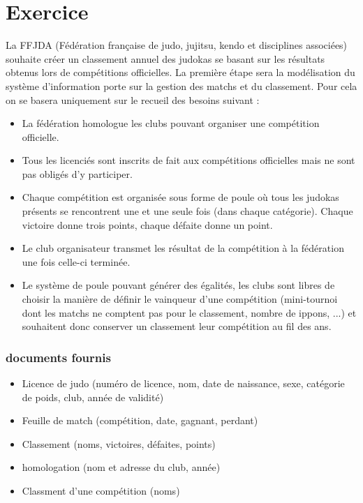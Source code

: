 \section*{Exercice}

La FFJDA (Fédération française de judo, jujitsu, kendo et disciplines associées) souhaite créer un classement annuel des judokas se basant sur les résultats obtenus lors de compétitions officielles. La première étape sera la modélisation du système d'information porte sur la gestion des matchs et du classement. Pour cela on se basera uniquement sur le recueil des besoins suivant : \\
\begin{itemize}
	\item La fédération homologue les clubs pouvant organiser une compétition officielle.
	\item Tous les licenciés sont inscrits de fait aux compétitions officielles mais ne sont pas obligés d'y participer.
	\item Chaque compétition est organisée sous forme de poule où tous les judokas présents se rencontrent une et une seule fois (dans chaque catégorie). Chaque victoire donne trois points, chaque défaite donne un point. 
	\item Le club organisateur transmet les résultat de la compétition à la fédération une fois celle-ci terminée.
	\item Le système de poule pouvant générer des égalités, les clubs sont libres de choisir la manière de définir le vainqueur d'une compétition (mini-tournoi dont les matchs ne comptent pas pour le classement, nombre de ippons, ...) et souhaitent donc conserver un classement leur compétition au fil des ans.
\end{itemize}

\subsubsection*{documents fournis}

\begin{itemize}
	\item Licence de judo (numéro de licence, nom, date de naissance, sexe, catégorie de poids, club, année de validité)
	\item Feuille de match (compétition, date, gagnant, perdant)
	\item Classement (noms, victoires, défaites, points)
	\item homologation (nom et adresse du club, année)
	\item Classment d'une compétition (noms)
\end{itemize}
